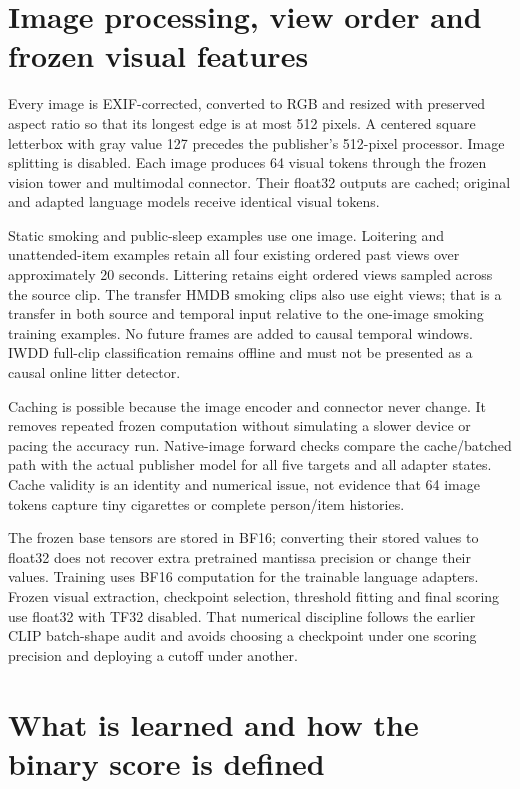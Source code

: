 
\section{Image processing, view order and frozen visual features}
Every image is EXIF-corrected, converted to RGB and resized with preserved aspect ratio so that its longest edge is at most 512 pixels. A centered square letterbox with gray value 127 precedes the publisher's 512-pixel processor. Image splitting is disabled. Each image produces 64 visual tokens through the frozen vision tower and multimodal connector. Their float32 outputs are cached; original and adapted language models receive identical visual tokens.

Static smoking and public-sleep examples use one image. Loitering and unattended-item examples retain all four existing ordered past views over approximately 20 seconds. Littering retains eight ordered views sampled across the source clip. The transfer HMDB smoking clips also use eight views; that is a transfer in both source and temporal input relative to the one-image smoking training examples. No future frames are added to causal temporal windows. IWDD full-clip classification remains offline and must not be presented as a causal online litter detector.

Caching is possible because the image encoder and connector never change. It removes repeated frozen computation without simulating a slower device or pacing the accuracy run. Native-image forward checks compare the cache/batched path with the actual publisher model for all five targets and all adapter states. Cache validity is an identity and numerical issue, not evidence that 64 image tokens capture tiny cigarettes or complete person/item histories.

The frozen base tensors are stored in BF16; converting their stored values to float32 does not recover extra pretrained mantissa precision or change their values. Training uses BF16 computation for the trainable language adapters. Frozen visual extraction, checkpoint selection, threshold fitting and final scoring use float32 with TF32 disabled. That numerical discipline follows the earlier CLIP batch-shape audit and avoids choosing a checkpoint under one scoring precision and deploying a cutoff under another.

\section{What is learned and how the binary score is defined}
